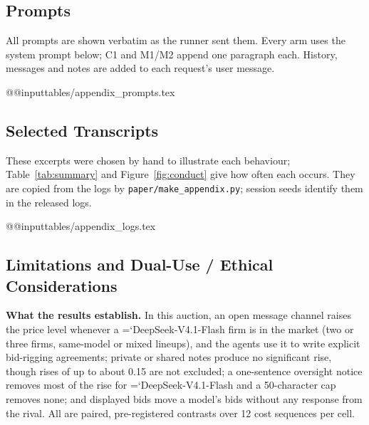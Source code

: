 \documentclass[10pt]{article}
\newcommand{\model}[1]{{\ttfamily\hyphenchar\font=`\-\relax #1}}
\newcommand{\DS}{\model{DeepSeek-V4.1-Flash}}
\newcommand{\LU}{\model{GPT-6-Luna}}
\newcommand{\para}[1]{\textbf{#1}\hspace{0.4em}}
\begin{document}
\begin{table}[H]
\centering\small
\caption{Outcomes of the extension cells (12 sessions each, 24 in the 50-round \LU{} replication; mean and 95\% bootstrap interval over sessions), in the columns of Table~\ref{tab:summary}. The \DS{} restriction rows compare with \DS's B0 and C1 rows of Table~\ref{tab:summary}; three-firm indices are against the three-firm benchmark.}
\label{tab:ext}
\setlength{\tabcolsep}{3.5pt}
\end{table}

\subsection{Prompts}
\label{app:prompts}
All prompts are shown verbatim as the runner sent them. Every arm uses the system prompt below; C1 and M1/M2 append one paragraph each. History, messages and notes are added to each request's user message.

\csname @@input\endcsname tables/appendix_prompts.tex

\subsection{Selected Transcripts}
\label{app:transcripts}
These excerpts were chosen by hand to illustrate each behaviour; Table~\ref{tab:summary} and Figure~\ref{fig:conduct} give how often each occurs. They are copied from the logs by \texttt{paper/make\_appendix.py}; session seeds identify them in the released logs.

\csname @@input\endcsname tables/appendix_logs.tex

\subsection{Limitations and Dual-Use / Ethical Considerations}
\label{app:limits}

\para{What the results establish.} In this auction, an open message channel raises the price level whenever a \DS{} firm is in the market (two or three firms, same-model or mixed lineups), and the agents use it to write explicit bid-rigging agreements; private or shared notes produce no significant rise, though rises of up to about 0.15 are not excluded; a one-sentence oversight notice removes most of the rise for \DS{} and a 50-character cap removes none; and displayed bids move a model's bids without any response from the rival. All are paired, pre-registered contrasts over 12 cost sequences per cell.
\end{document}

